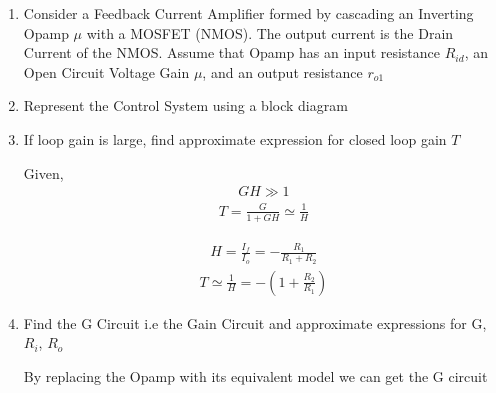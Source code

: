 \begin{enumerate}[label=\thesubsection.\arabic*.,ref=\thesubsection.\theenumi]
\item
Consider a Feedback Current Amplifier formed by cascading an Inverting Opamp $\mu$ with a MOSFET (NMOS).
The output current is the Drain Current of the NMOS.
Assume that Opamp has an input resistance $R_{id}$, an Open Circuit Voltage Gain $\mu$, and an output resistance $r_{o1}$

\begin{figure}[!ht]
	\begin{center}
		\resizebox{\columnwidth}{!}{}
	\end{center}
\caption{}
\label{fig:Complete_Circuit}
\end{figure}

\item
Represent the Control System using a block diagram

\solution
\begin{figure}[!ht]
	\begin{center}
			\resizebox{\columnwidth}{!}{}
	\end{center}
\caption{}
\label{fig:Block_Diagram}
\end{figure}

\item
If loop gain is large, find approximate expression for closed loop gain $T$

\solution
Given,
\begin{align}
    GH \gg 1
\end{align}
\begin{align}
    T = \frac{G}{1+GH}\simeq \frac{1}{H}
\end{align}

\begin{align}
    H = \frac{I_{f}}{I_{o}}=-\frac{R_{1}}{R_{1}+R_{2}}
\end{align}
\begin{align}
    T \simeq \frac{1}{H}=-\left(1+\frac{R_{2}}{R_{1}}\right)
\end{align}

\item
Find the G Circuit i.e the Gain Circuit and approximate expressions for G, $R_{i}$, $R_{o}$

\solution
By replacing the Opamp with its equivalent model we can get the G circuit

\begin{figure}[!ht]
	\begin{center}
		

\end{center}
\end{figure}
\end{enumerate}
